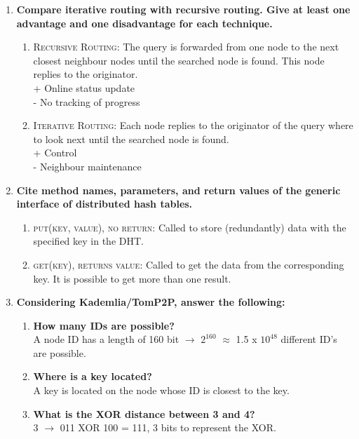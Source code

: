 \documentclass{article}
\begin{document}
\begin{enumerate}[1]
\item \textbf{Compare iterative routing with recursive routing. Give at least one advantage and one disadvantage for each technique.} 
\begin{enumerate}[]
	\item\textsc{Recursive Routing}: The query is forwarded from one node to the next closest neighbour nodes until the searched node is found. This node replies to the originator. \\
{\color{green} +} Online status update \\
{\color{red} -} No tracking of progress \\
	\item\textsc{Iterative Routing}: Each node replies to the originator of the query where to look next until the searched node is found. \\  
{\color{green} +} Control \\
{\color{red} -} Neighbour maintenance \\
\end{enumerate} 

\item \textbf{Cite method names, parameters, and return values of the generic interface of distributed hash tables.} 
\begin{enumerate}[]
	\item\textsc{put(key, value), no return}: Called to store (redundantly) data with the specified key in the DHT. 
	\item\textsc{get(key), returns value}: Called to get the data from the corresponding key. It is possible to get more than one result. \\  
\end{enumerate} 


\item \textbf{Considering Kademlia/TomP2P, answer the following:} 
\begin{enumerate}[1]
	\item\textbf{How many IDs are possible?} \\ A node ID has a length of 160 bit $\rightarrow$ $2^{160}$ $\approx$ 1.5 x $10^{48}$ different ID's are possible.
	\item\textbf{Where is a key located?} \\ A key is located on the node whose ID is closest to the key.
	\item\textbf{What is the XOR distance between 3 and 4?} \\ 3 $\rightarrow$ 011 XOR 100 = 111, 3 bits to represent the XOR. \\
\end{enumerate}
\end{enumerate}
\end{document}

